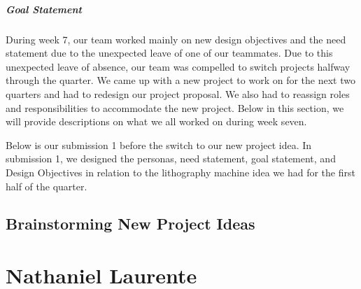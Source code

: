 \subparagraph{Goal Statement}

During week 7, our team worked mainly on new design objectives and the need statement due to the unexpected leave of one of our teammates. Due to this unexpected leave of absence, our team was compelled to switch projects halfway through the quarter. We came up with a new project to work on for the next two quarters and had to redesign our project proposal. We also had to reassign roles and responsibilities to accommodate the new project. Below in this section, we will provide descriptions on what we all worked on during week seven.

Below is our submission 1 before the switch to our new project idea. In submission 1, we designed the personas, need statement, goal statement, and Design Objectives in relation to the lithography machine idea we had for the first half of the quarter.


\subsection{Brainstorming New Project Ideas}



\section{Nathaniel Laurente}

